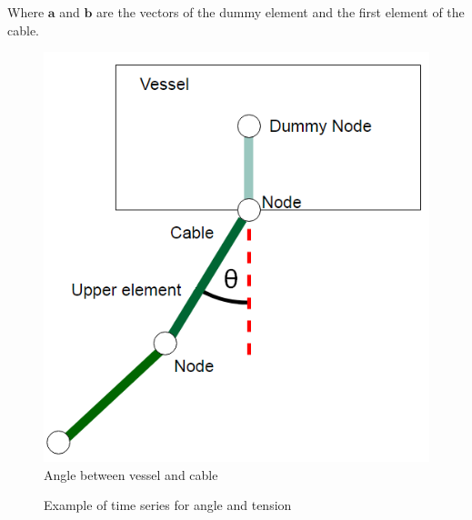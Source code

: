 Where $\boldsymbol{a}$ and $\boldsymbol{b}$ are the vectors of the dummy element and the first element of the cable. 

\begin{figure}[H]
\centering
\includegraphics[scale=0.5]{figures/angle}
\caption[Angle between vessel and cable ]{Angle between vessel and cable  }
 \label{fig:angle}
\end{figure}

\begin{figure}[H]
\hfill
{}\hfill
\caption{Example of time series for angle and tension}
\label{fig:timeex}
\end{figure}

